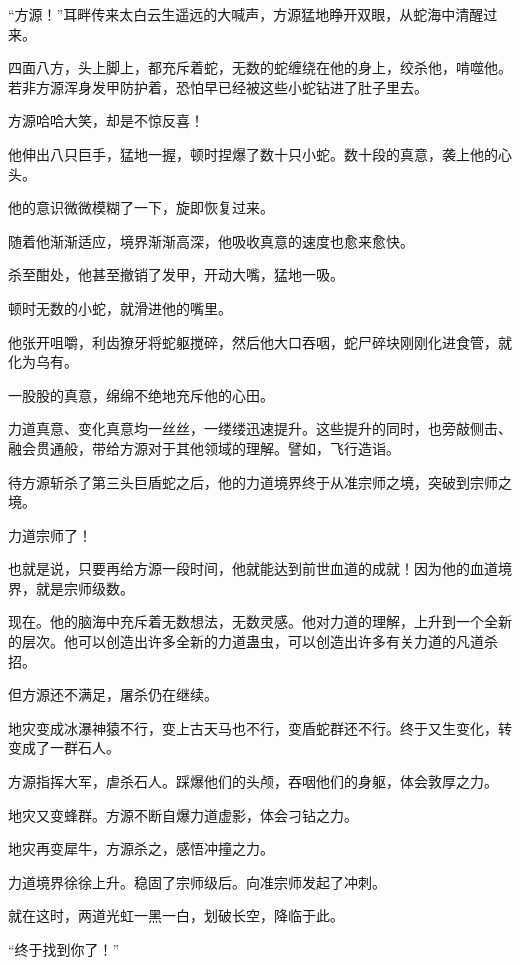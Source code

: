 
\begin{this_body}

“方源！”耳畔传来太白云生遥远的大喊声，方源猛地睁开双眼，从蛇海中清醒过来。

四面八方，头上脚上，都充斥着蛇，无数的蛇缠绕在他的身上，绞杀他，啃噬他。若非方源浑身发甲防护着，恐怕早已经被这些小蛇钻进了肚子里去。

方源哈哈大笑，却是不惊反喜！

他伸出八只巨手，猛地一握，顿时捏爆了数十只小蛇。数十段的真意，袭上他的心头。

他的意识微微模糊了一下，旋即恢复过来。

随着他渐渐适应，境界渐渐高深，他吸收真意的速度也愈来愈快。

杀至酣处，他甚至撤销了发甲，开动大嘴，猛地一吸。

顿时无数的小蛇，就滑进他的嘴里。

他张开咀嚼，利齿獠牙将蛇躯搅碎，然后他大口吞咽，蛇尸碎块刚刚化进食管，就化为乌有。

一股股的真意，绵绵不绝地充斥他的心田。

力道真意、变化真意均一丝丝，一缕缕迅速提升。这些提升的同时，也旁敲侧击、融会贯通般，带给方源对于其他领域的理解。譬如，飞行造诣。

待方源斩杀了第三头巨盾蛇之后，他的力道境界终于从准宗师之境，突破到宗师之境。

力道宗师了！

也就是说，只要再给方源一段时间，他就能达到前世血道的成就！因为他的血道境界，就是宗师级数。

现在。他的脑海中充斥着无数想法，无数灵感。他对力道的理解，上升到一个全新的层次。他可以创造出许多全新的力道蛊虫，可以创造出许多有关力道的凡道杀招。

但方源还不满足，屠杀仍在继续。

地灾变成冰瀑神猿不行，变上古天马也不行，变盾蛇群还不行。终于又生变化，转变成了一群石人。

方源指挥大军，虐杀石人。踩爆他们的头颅，吞咽他们的身躯，体会敦厚之力。

地灾又变蜂群。方源不断自爆力道虚影，体会刁钻之力。

地灾再变犀牛，方源杀之，感悟冲撞之力。

力道境界徐徐上升。稳固了宗师级后。向准宗师发起了冲刺。

就在这时，两道光虹一黑一白，划破长空，降临于此。

“终于找到你了！”


\end{this_body}

